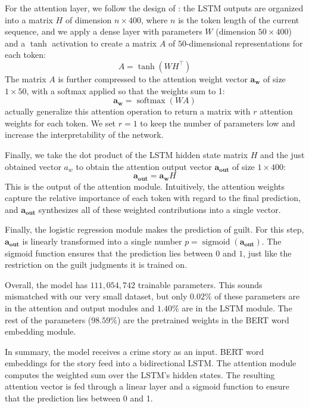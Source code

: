 \documentclass[11pt,a4paper]{article}
\DeclareMathOperator{\softmax}{softmax}
\DeclareMathOperator{\sigmoid}{sigmoid}
\newcommand{\aout}{\mathbf{a_{\text{out}}}}
\begin{document}
For the attention layer, we follow the design of \citeauthor{Lin:2017}: the LSTM outputs are organized into a matrix $H$ of dimension $n \times 400$, where $n$ is the token length of the current sequence, and we apply a dense layer with parameters $W$ (dimension $50 \times 400$) and a $\tanh$ activation to create a matrix $A$ of $50$-dimensional representations for each token:
\begin{equation}
  A = \tanh(WH^{\top}) \label{eq:A}
\end{equation}
%
The matrix $A$ is further compressed to the attention weight vector $\mathbf{a_w}$ of size $1 \times 50$, with a softmax applied so that the weights sum to 1:
%
\begin{equation}
  \mathbf{a_w} = \softmax(WA) \label{eq:attn}
\end{equation}
%
\citeauthor{Lin:2017} actually generalize this attention operation to return a matrix with $r$ attention weights for each token. We set $r=1$ to keep the number of parameters low and increase the interpretability of the network.

Finally, we take the dot product of the LSTM hidden state matrix $H$ and the just obtained vector $a_w$ to obtain the attention output vector $\aout$ of size $1 \times 400$:
%
\begin{equation}
  \aout = \mathbf{a_w}H \label{eq:aout}
\end{equation}
%
This is the output of the attention module. Intuitively, the attention weights capture the relative importance of each token with regard to the final prediction, and $\aout$ synthesizes all of these weighted contributions into a single vector.

Finally, the logistic regression module makes the prediction of guilt. For this step, $\aout$ is linearly transformed into a single number $p = \sigmoid(\aout)$. The sigmoid function ensures that the prediction lies between $0$ and $1$, just like the restriction on the guilt judgments it is trained on.

Overall, the model has $111,054,742$ trainable parameters. This sounds mismatched with our very small dataset, but only $0.02\%$ of these parameters are in the attention and output modules and $1.40\%$ are in the LSTM module. The rest of the parameters ($98.59\%$) are the pretrained weights in the BERT word embedding module.

In summary, the model receives a crime story as an input. BERT word embeddings for the story feed into a bidirectional LSTM. The attention module computes the weighted sum over the LSTM's hidden states. The resulting attention vector is fed through a linear layer and a sigmoid function to ensure that the prediction lies between 0 and 1.
\end{document}
